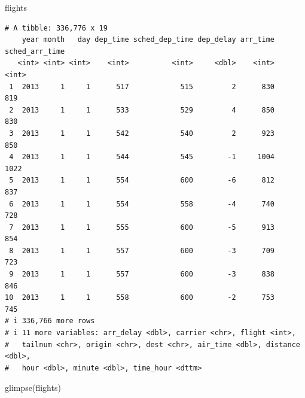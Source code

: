 \documentclass[
  letterpaper,
  DIV=11,
  numbers=noendperiod]{scrreprt}
\newenvironment{Shaded}{\begin{snugshade}}{\end{snugshade}}
\newcommand{\FunctionTok}[1]{\textcolor[rgb]{0.28,0.35,0.67}{#1}}
\newcommand{\NormalTok}[1]{\textcolor[rgb]{0.00,0.23,0.31}{#1}}
\begin{document}
\begin{Shaded}
\begin{Highlighting}[]
\NormalTok{flights}
\end{Highlighting}
\end{Shaded}

\begin{verbatim}
# A tibble: 336,776 x 19
    year month   day dep_time sched_dep_time dep_delay arr_time sched_arr_time
   <int> <int> <int>    <int>          <int>     <dbl>    <int>          <int>
 1  2013     1     1      517            515         2      830            819
 2  2013     1     1      533            529         4      850            830
 3  2013     1     1      542            540         2      923            850
 4  2013     1     1      544            545        -1     1004           1022
 5  2013     1     1      554            600        -6      812            837
 6  2013     1     1      554            558        -4      740            728
 7  2013     1     1      555            600        -5      913            854
 8  2013     1     1      557            600        -3      709            723
 9  2013     1     1      557            600        -3      838            846
10  2013     1     1      558            600        -2      753            745
# i 336,766 more rows
# i 11 more variables: arr_delay <dbl>, carrier <chr>, flight <int>,
#   tailnum <chr>, origin <chr>, dest <chr>, air_time <dbl>, distance <dbl>,
#   hour <dbl>, minute <dbl>, time_hour <dttm>
\end{verbatim}

\begin{Shaded}
\begin{Highlighting}[]
\FunctionTok{glimpse}\NormalTok{(flights)}
\end{Highlighting}
\end{Shaded}
\end{document}
